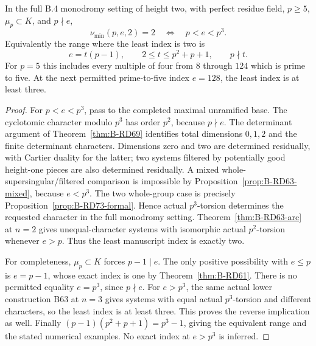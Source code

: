 \begin{theorem}
\label{thm:B-RD73}
In the full B.4 monodromy setting of height two, with perfect
residue field, \(p\ge5\), \(\mu_p\subset K\), and \(p\nmid e\),
\[
 \boxed{\nu_{\min}(p,e,2)=2\quad\Longleftrightarrow\quad p<e<p^3.}
 \tag{B-RD73.15}
\]
Equivalently the range where the least index is two is
\[
 e=t(p-1),\qquad 2\le t\le p^2+p+1,
 \qquad p\nmid t.
 \tag{B-RD73.16}
\]
For \(p=5\) this includes every multiple of four from \(8\)
through \(124\) which is prime to five. At the next permitted
prime-to-five index \(e=128\), the least index is at least three.
\end{theorem}
\begin{proof}
For \(p<e<p^3\), pass to the completed maximal unramified base.
The cyclotomic character modulo \(p^3\) has order \(p^2\),
because \(p\nmid e\). The determinant argument of
Theorem~\ref{thm:B-RD69} identifies total dimensions \(0,1,2\)
and the finite determinant characters. Dimensions zero and two
are determined residually, with Cartier duality for the latter;
two systems filtered by potentially good height-one pieces are
also determined residually. A mixed whole-supersingular/filtered
comparison is impossible by Proposition~\ref{prop:B-RD63-mixed},
because \(e<p^3\). The two whole-group case is precisely
Proposition~\ref{prop:B-RD73-formal}. Hence actual \(p^3\)-torsion
determines the requested character in the full monodromy setting.
Theorem~\ref{thm:B-RD63-arc} at \(n=2\) gives unequal-character
systems with isomorphic actual \(p^2\)-torsion whenever \(e>p\).
Thus the least manuscript index is exactly two.

For completeness, \(\mu_p\subset K\) forces \(p-1\mid e\).
The only positive possibility with \(e\le p\) is \(e=p-1\),
whose exact index is one by Theorem~\ref{thm:B-RD61}.
There is no permitted equality \(e=p^3\), since \(p\nmid e\).
For \(e>p^3\), the same actual lower construction B63 at
\(n=3\) gives systems with equal actual \(p^3\)-torsion and
different characters, so the least index is at least three.
This proves the reverse implication as well.
Finally \((p-1)(p^2+p+1)=p^3-1\), giving the equivalent range
and the stated numerical examples. No exact index at \(e>p^3\)
is inferred.
\end{proof}

